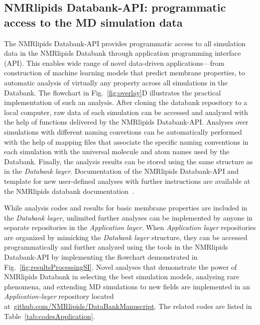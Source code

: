 \documentclass[fleqn,10pt]{wlscirep}
\begin{document}
\subsection{NMRlipids Databank-API: programmatic access to the MD simulation data}\label{section:access}
The NMRlipids Databank-API provides programmatic access to all simulation data in the NMRlipids Databank through application programming interface (API). This enables wide range of novel data-driven applications---from construction of machine learning models that predict membrane properties, to automatic analysis of virtually any property across all simulations in the Databank. The flowchart in Fig.~\ref{fig:overlay}D illustrates the practical implementation of such an analysis. After cloning the databank repository to a local computer, raw data of each simulation can be accessed and analyzed with the help of functions delivered by the NMRlipids Databank-API. 
Analyses over simulations with different naming convetions can be automatically performed with the help of mapping files that associate the specific naming conventions in each simulation with the universal molecule and atom names used by the Databank. Finally, the analysis results can be stored using the same structure as in the {\it Databank layer}. Documentation of the NMRlipids Databank-API and template for new user-defined analyses with further instructions are available at the NMRlipids databank documentation~\cite{NMRlipidsExampleAndTutorials}.

While analysis codes and results for basic membrane properties are included in the {\it Databank layer}, unlimited further analyses can be implemented by anyone in separate repositories in the {\it Application layer}. When {\it Application layer} repositories are organized by mimicking the {\it Databank layer} structure, they can be accessed programmatically and further analyzed using the tools in the NMRlipids Databank-API by implementing the flowchart demonstrated in Fig.~\ref{fig:resultsProcessingSI}. Novel analyses that demonstrate the power of NMRlipids Databank in selecting the best simulation models, analysing rare phenomena, and extending MD simulations to new fields are implemented in an {\it Application-layer} repository located at~\href{https://github.com/NMRlipids/DataBankManuscript}{github.com/NMRlipids/DataBankManuscript}. The related codes are listed in Table~\ref{tab:codesApplication}.
\end{document}
